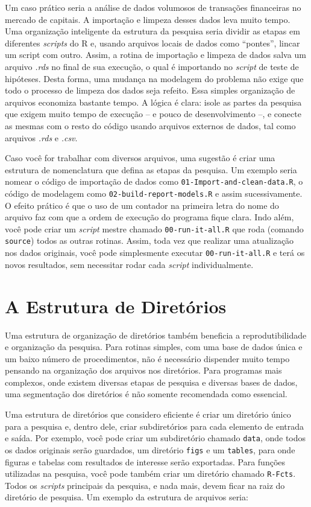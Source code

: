\documentclass[
  11pt,
]{book}
\begin{document}
Um caso prático seria a análise de dados volumosos de transações financeiras no mercado de capitais. A importação e limpeza desses dados leva muito tempo. Uma organização inteligente da estrutura da pesquisa seria dividir as etapas em diferentes \emph{scripts} do R e, usando arquivos locais de dados como ``pontes'', lincar um script com outro. Assim, a rotina de importação e limpeza de dados salva um arquivo \emph{.rds} no final de sua execução, o qual é importando no \emph{script} de teste de hipóteses. Desta forma, uma mudança na modelagem do problema não exige que todo o processo de limpeza dos dados seja refeito. Essa simples organização de arquivos economiza bastante tempo. A lógica é clara: isole as partes da pesquisa que exigem muito tempo de execução -- e pouco de desenvolvimento --, e conecte as mesmas com o resto do código usando arquivos externos de dados, tal como arquivos \emph{.rds} e \emph{.csv}.

Caso você for trabalhar com diversos arquivos, uma sugestão é criar uma estrutura de nomenclatura que defina as etapas da pesquisa. Um exemplo seria nomear o código de importação de dados como \texttt{01-Import-and-clean-data.R}, o código de modelagem como \texttt{02-build-report-models.R} e assim sucessivamente. O efeito prático é que o uso de um contador na primeira letra do nome do arquivo faz com que a ordem de execução do programa fique clara. Indo além, você pode criar um \emph{script} mestre chamado \texttt{00-run-it-all.R} que roda (comando \texttt{source}) todos as outras rotinas. Assim, toda vez que realizar uma atualização nos dados originais, você pode simplesmente executar \texttt{00-run-it-all.R} e terá os novos resultados, sem necessitar rodar cada \emph{script} individualmente.

\hypertarget{diretorios}{%
\section{A Estrutura de Diretórios}\label{diretorios}}

Uma estrutura de organização de diretórios também beneficia a reprodutibilidade e organização da pesquisa. Para rotinas simples, com uma base de dados única e um baixo número de procedimentos, não é necessário dispender muito tempo pensando na organização dos arquivos nos diretórios. Para programas mais complexos, onde existem diversas etapas de pesquisa e diversas bases de dados, uma segmentação dos diretórios é não somente recomendada como essencial.

Uma estrutura de diretórios que considero eficiente é criar um diretório único para a pesquisa e, dentro dele, criar subdiretórios para cada elemento de entrada e saída. Por exemplo, você pode criar um subdiretório chamado \texttt{data}, onde todos os dados originais serão guardados, um diretório \texttt{figs} e um \texttt{tables}, para onde figuras e tabelas com resultados de interesse serão exportadas. Para funções utilizadas na pesquisa, você pode também criar um diretório chamado \texttt{R-Fcts}. Todos os \emph{scripts} principais da pesquisa, e nada mais, devem ficar na raiz do diretório de pesquisa. Um exemplo da estrutura de arquivos seria:
\end{document}
